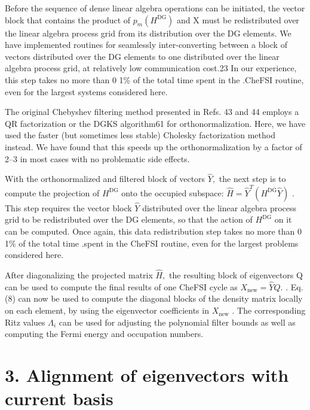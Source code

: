 \documentclass[
  10
]{article}
\begin{document}
Before the sequence of dense linear algebra operations can be initiated,
the vector block that contains the product of
\(p _ { m } ( H ^ { \mathrm { D G } } )\) and X must be redistributed
over the linear algebra process grid from its distribution over the DG
elements. We have implemented routines for seamlessly inter-converting
between a block of vectors distributed over the DG elements to one
distributed over the linear algebra process grid, at relatively low
communication cost.23 In our experience, this step takes no more than 0
1\% of the total time spent in the .CheFSI routine, even for the largest
systems considered here.

The original Chebyshev filtering method presented in Refs. 43 and 44
employs a QR factorization or the DGKS algorithm61 for
orthonormalization. Here, we have used the faster (but sometimes less
stable) Cholesky factorization method instead. We have found that this
speeds up the orthonormalization by a factor of 2--3 in most cases with
no problematic side effects.

With the orthonormalized and filtered block of vectors
\({ \hat { Y } } ,\) the next step is to compute the projection of
\(H ^ { \mathrm { D G } }\) onto the occupied subspace:
\(\hat { H } = \hat { Y } ^ { T } ( H ^ { \mathrm { D } \mathrm { \bar { G } } } \hat { Y } )\)
. This step requires the vector block \(\hat { Y }\) distributed over
the linear algebra process grid to be redistributed over the DG
elements, so that the action of \(H ^ { \mathrm { D G } }\) on it can be
computed. Once again, this data redistribution step takes no more than 0
1\% of the total time .spent in the CheFSI routine, even for the largest
problems considered here.

After diagonalizing the projected matrix \(\hat { H } ,\) the resulting
block of eigenvectors Q can be used to compute the final results of one
CheFSI cycle as \(X _ { \mathrm { n e w } } = { \hat { Y } } Q .\) . Eq.
(8) can now be used to compute the diagonal blocks of the density matrix
locally on each element, by using the eigenvector coefficients in
\(X _ { \mathrm { n e w } }\) . The corresponding Ritz values
\(\Lambda _ { i }\) can be used for adjusting the polynomial filter
bounds as well as computing the Fermi energy and occupation numbers.

\section{3. Alignment of eigenvectors with current
basis}\label{alignment-of-eigenvectors-with-current-basis}
\end{document}
